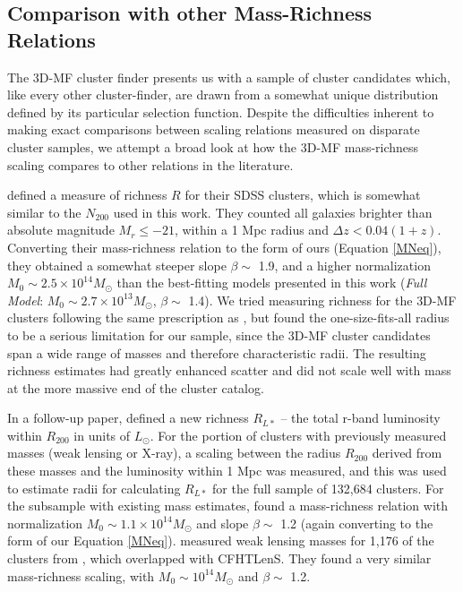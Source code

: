 
\subsection{Comparison with other Mass-Richness Relations}

The \ac{3D-MF} cluster finder presents us with a sample of cluster candidates which, like every other cluster-finder, are drawn from a somewhat unique distribution defined by its particular selection function. Despite the difficulties inherent to making exact comparisons between scaling relations measured on disparate cluster samples, we attempt a broad look at how the \ac{3D-MF} mass-richness scaling compares to other relations in the literature.

\citet{Wen09} defined a measure of richness $R$ for their SDSS clusters, which is somewhat similar to the $N_{200}$ used in this work. They counted all galaxies brighter than absolute magnitude $M_r \leq -21$, within a 1 Mpc radius and $\Delta z < 0.04(1+z)$. Converting their mass-richness relation to the form of ours (Equation \ref{MNeq}), they obtained a somewhat steeper slope $\beta \sim$ 1.9, and a higher normalization $M_0 \sim 2.5\times10^{14} M_{\odot}$ than the best-fitting models presented in this work ({\it Full Model}: $M_0 \sim 2.7\times10^{13} M_{\odot}$, $\beta \sim$ 1.4). We tried measuring richness for the \ac{3D-MF} clusters following the same prescription as \citet{Wen09}, but found the one-size-fits-all radius to be a serious limitation for our sample, since the \ac{3D-MF} cluster candidates span a wide range of masses and therefore characteristic radii. The resulting richness estimates had greatly enhanced scatter and did not scale well with mass at the more massive end of the cluster catalog.

In a follow-up paper, \citet{Wen12} defined a new richness $R_{L*}$ -- the total r-band luminosity within $R_{200}$ in units of $L_{\odot}$. For the portion of clusters with previously measured masses (weak lensing or X-ray), a scaling between the radius $R_{200}$ derived from these masses and the luminosity within 1 Mpc was measured, and this was used to estimate radii for calculating $R_{L*}$ for the full sample of 132,684 clusters. For the subsample with existing mass estimates, \citet{Wen12} found a mass-richness relation with normalization $M_0 \sim 1.1 \times 10^{14} M_{\odot}$ and slope $\beta \sim$ 1.2 (again converting to the form of our Equation \ref{MNeq}). \citet{Covone14} measured weak lensing masses for 1,176 of the clusters from \citet{Wen12}, which overlapped with \ac{CFHTLenS}. They found a very similar mass-richness scaling, with $M_0 \sim 10^{14} M_{\odot}$ and $\beta \sim$ 1.2. 

